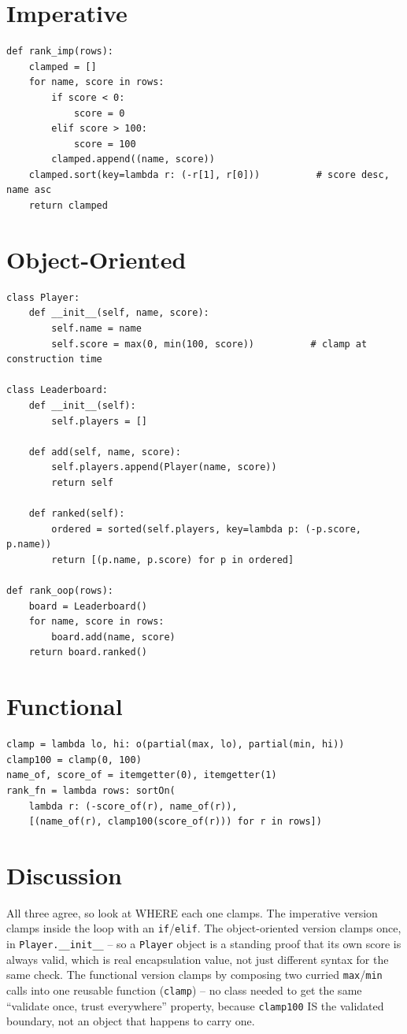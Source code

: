 \documentclass[10pt,letterpaper]{book}
\begin{document}
\section*{Imperative}
\begin{lstlisting}[style=code]
def rank_imp(rows):
    clamped = []
    for name, score in rows:
        if score < 0:
            score = 0
        elif score > 100:
            score = 100
        clamped.append((name, score))
    clamped.sort(key=lambda r: (-r[1], r[0]))          # score desc, name asc
    return clamped
\end{lstlisting}
\section*{Object-Oriented}
\begin{lstlisting}[style=code]
class Player:
    def __init__(self, name, score):
        self.name = name
        self.score = max(0, min(100, score))          # clamp at construction time

class Leaderboard:
    def __init__(self):
        self.players = []

    def add(self, name, score):
        self.players.append(Player(name, score))
        return self

    def ranked(self):
        ordered = sorted(self.players, key=lambda p: (-p.score, p.name))
        return [(p.name, p.score) for p in ordered]

def rank_oop(rows):
    board = Leaderboard()
    for name, score in rows:
        board.add(name, score)
    return board.ranked()
\end{lstlisting}
\section*{Functional}
\begin{lstlisting}[style=code]
clamp = lambda lo, hi: o(partial(max, lo), partial(min, hi))
clamp100 = clamp(0, 100)
name_of, score_of = itemgetter(0), itemgetter(1)
rank_fn = lambda rows: sortOn(
    lambda r: (-score_of(r), name_of(r)),
    [(name_of(r), clamp100(score_of(r))) for r in rows])
\end{lstlisting}
\section*{Discussion}

All three agree, so look at WHERE each one clamps. The imperative version
clamps inside the loop with an \texttt{if}/\texttt{elif}. The
object-oriented version clamps once, in \texttt{Player.\_\_init\_\_} --
so a \texttt{Player} object is a standing proof that its own score is
always valid, which is real encapsulation value, not just different
syntax for the same check. The functional version clamps by composing two
curried \texttt{max}/\texttt{min} calls into one reusable function
(\texttt{clamp}) -- no class needed to get the same ``validate once,
trust everywhere'' property, because \texttt{clamp100} IS the validated
boundary, not an object that happens to carry one.
\end{document}
